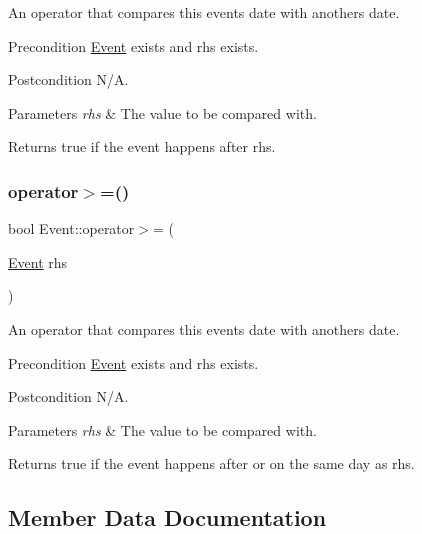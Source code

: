 An operator that compares this event\textquotesingle{}s date with another\textquotesingle{}s date. \begin{DoxyPrecond}{Precondition}
\mbox{\hyperlink{class_event}{Event}} exists and rhs exists. 
\end{DoxyPrecond}
\begin{DoxyPostcond}{Postcondition}
N/A. 
\end{DoxyPostcond}

\begin{DoxyParams}{Parameters}
{\em rhs} & The value to be compared with. \\
\hline
\end{DoxyParams}
\begin{DoxyReturn}{Returns}
true if the event happens after rhs. 
\end{DoxyReturn}
\mbox{\label{class_event_a44f9197c76b0bee4aa9fd8b383165474}} 
\subsubsection{\texorpdfstring{operator$>$=()}{operator>=()}}
{\footnotesize\ttfamily bool Event\+::operator$>$= (\begin{DoxyParamCaption}\item[{\mbox{\hyperlink{class_event}{Event}}}]{rhs }\end{DoxyParamCaption})}

An operator that compares this event\textquotesingle{}s date with another\textquotesingle{}s date. \begin{DoxyPrecond}{Precondition}
\mbox{\hyperlink{class_event}{Event}} exists and rhs exists. 
\end{DoxyPrecond}
\begin{DoxyPostcond}{Postcondition}
N/A. 
\end{DoxyPostcond}

\begin{DoxyParams}{Parameters}
{\em rhs} & The value to be compared with. \\
\hline
\end{DoxyParams}
\begin{DoxyReturn}{Returns}
true if the event happens after or on the same day as rhs. 
\end{DoxyReturn}


\subsection{Member Data Documentation}
\mbox{\label{class_event_a20fc63392defc87c1798e53a6f12832b}} 
